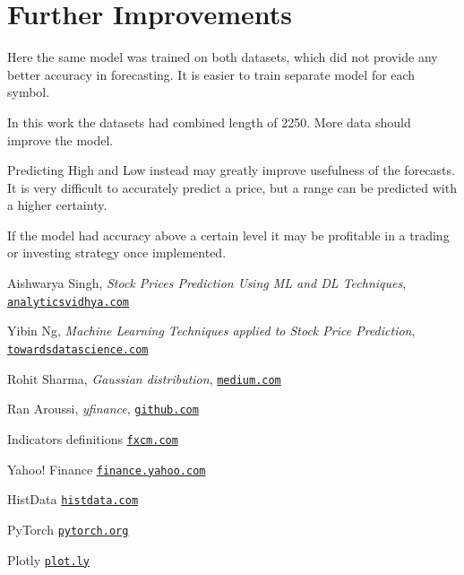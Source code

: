 \documentclass[a4paper,12pt]{article}
\begin{document}
\section{Further Improvements}
Here the same model was trained on both datasets, which did not provide any better accuracy in forecasting.
It is easier to train separate model for each symbol.

In this work the datasets had combined length of 2250. More data should improve the model.

Predicting High and Low instead may greatly improve usefulness of the forecasts. It is very difficult to accurately predict a price, but a range can be predicted with a higher certainty.

If the model had accuracy above a certain level it may be profitable in a trading or investing strategy once implemented.


\pagebreak
\begin{thebibliography}{15}
	
Aishwarya Singh, \textit{Stock Prices Prediction Using ML and DL Techniques},
\texttt{\href{https://www.analyticsvidhya.com/blog/2018/10/predicting-stock-price-machine-learningnd-deep-learning-techniques-python/}{analyticsvidhya.com}}

Yibin Ng, \textit{Machine Learning Techniques applied to Stock Price Prediction}, \texttt{\href{https://towardsdatascience.com/machine-learning-techniques-applied-to-stock-price-prediction-6c1994da8001}{towardsdatascience.com}}

Rohit Sharma, \textit{Gaussian distribution}, \texttt{\href{https://medium.com/ai-techsystems/gaussian-distribution-why-is-it-important-in-data-science-and-machine-learning-9adbe0e5f8ac}{medium.com}}


Ran Aroussi, \textit{yfinance}, \texttt{\href{https://github.com/ranaroussi/yfinance}{github.com}}

Indicators definitions
\texttt{\href{https://www.fxcm.com/uk/insights/learn-forex-oscillators-and-momentum-indicators/}{fxcm.com}}

Yahoo! Finance
\texttt{\href{https://finance.yahoo.com}{finance.yahoo.com}}

HistData
\texttt{\href{http://histdata.com}{histdata.com}}

PyTorch
\texttt{\href{https://pytorch.org/}{pytorch.org}}

Plotly
\texttt{\href{https://plot.ly/javascript/}{plot.ly}}

\end{thebibliography}
\end{document}
